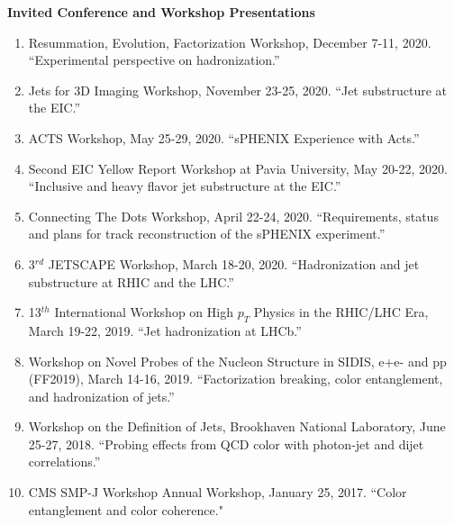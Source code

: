 \documentclass[11pt]{article}
\begin{document}

\vspace{7pt}

\begin{flushleft}
	\Large\textbf{Invited Conference and Workshop Presentations}
	\normalsize
	\begin{enumerate}
		\item Resummation, Evolution, Factorization Workshop, December 7-11, 2020. ``Experimental perspective on hadronization.''
		\item Jets for 3D Imaging Workshop, November 23-25, 2020. ``Jet substructure at the EIC.''
		\item ACTS Workshop, May 25-29, 2020. ``sPHENIX Experience with Acts.''
		\item Second EIC Yellow Report Workshop at Pavia University, May 20-22, 2020. ``Inclusive and heavy flavor jet substructure at the EIC.''
		\item Connecting The Dots Workshop, April 22-24, 2020. ``Requirements, status and plans for track reconstruction of the sPHENIX experiment.''
		\item 3$^{rd}$ JETSCAPE Workshop, March 18-20, 2020. ``Hadronization and jet substructure at RHIC and the LHC.''
		\item 13$^{th}$ International Workshop on High $p_T$ Physics in the RHIC/LHC Era, March 19-22, 2019. ``Jet hadronization at LHCb.''
		\item Workshop on Novel Probes of the Nucleon Structure in SIDIS, e+e- and pp (FF2019), March 14-16, 2019. ``Factorization breaking, color entanglement, and hadronization of jets.''
		\item Workshop on the Definition of Jets, Brookhaven National Laboratory, June 25-27, 2018. ``Probing effects from QCD color with photon-jet and dijet correlations.''
		\item CMS SMP-J Workshop Annual Workshop, January 25, 2017. ``Color entanglement and color coherence."
	\end{enumerate}
\end{flushleft}
\end{document}
